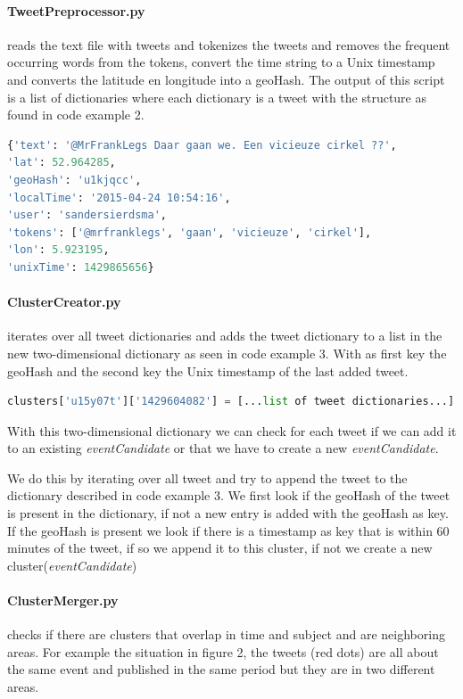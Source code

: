 \documentclass[
10pt, %
a4paper, %
oneside, %
headinclude,footinclude, %
BCOR5mm, %
]{scrartcl}
\begin{document}
\paragraph{TweetPreprocessor.py}reads the text file with tweets and tokenizes the tweets and removes the frequent occurring words from the tokens, convert the time string to a Unix timestamp and converts the latitude en longitude into a geoHash. The output of this script is a list of dictionaries where each dictionary is a tweet with the structure as found in code example 2.

\begin{lstlisting}[language=Python, caption=Tweet dictionary]
{'text': '@MrFrankLegs Daar gaan we. Een vicieuze cirkel ??', 
'lat': 52.964285, 
'geoHash': 'u1kjqcc', 
'localTime': '2015-04-24 10:54:16', 
'user': 'sandersierdsma', 
'tokens': ['@mrfranklegs', 'gaan', 'vicieuze', 'cirkel'], 
'lon': 5.923195, 
'unixTime': 1429865656}
\end{lstlisting}
\paragraph{ClusterCreator.py} iterates over all tweet dictionaries and adds the tweet dictionary to a list in the new two-dimensional dictionary as seen in code example 3. With as first key the geoHash and the second key the Unix timestamp of the last added tweet. 
\begin{lstlisting}[language=Python, caption=Result dictionary]
clusters['u15y07t']['1429604082'] = [...list of tweet dictionaries...]
\end{lstlisting}
With this two-dimensional dictionary we can check for each tweet if we can add it to an existing \textit{eventCandidate} or that we have to create a new \textit{eventCandidate}. 

We do this by iterating over all tweet and try to append the tweet to the dictionary described in code example 3. We first look if the geoHash of the tweet is present in the dictionary, if not a new entry is added with the geoHash as key. If the geoHash is present we look if there is a timestamp as key that is within 60 minutes of the tweet, if so we append it to this cluster, if not we create a new cluster(\textit{eventCandidate})

\paragraph{ClusterMerger.py} checks if there are clusters that overlap in time and subject and are neighboring areas. For example the situation in figure 2, the tweets (red dots) are all about the same event and published in the same period but they are in two different areas.  
\end{document}
